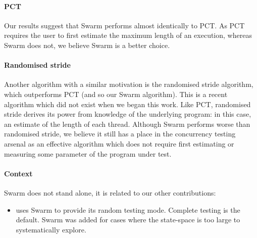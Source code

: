 \paragraph{PCT}
Our results suggest that Swarm performs almost identically to PCT.  As
PCT requires the user to first estimate the maximum length of an
execution, whereas Swarm does not, we believe Swarm is a better
choice.

\paragraph{Randomised stride}
Another algorithm with a similar motivation is the randomised stride
algorithm\cite{abdelrasoul2017}, which outperforms PCT (and so our
Swarm algorithm).  This is a recent algorithm which did not exist when
we began this work.  Like PCT, randomised stride derives its power
from knowledge of the underlying program: in this case, an estimate of
the length of each thread.  Although Swarm performs worse than
randomised stride, we believe it still has a place in the concurrency
testing arsenal as an effective algorithm which does not require first
estimating or measuring some parameter of the program under test.

\paragraph{Context}
Swarm does not stand alone, it is related to our other contributions:

\begin{itemize}
\item {} uses Swarm to provide its random testing mode.
  Complete testing is the default.  Swarm was added for cases where
  the state-space is too large to systematically explore.
\end{itemize}
